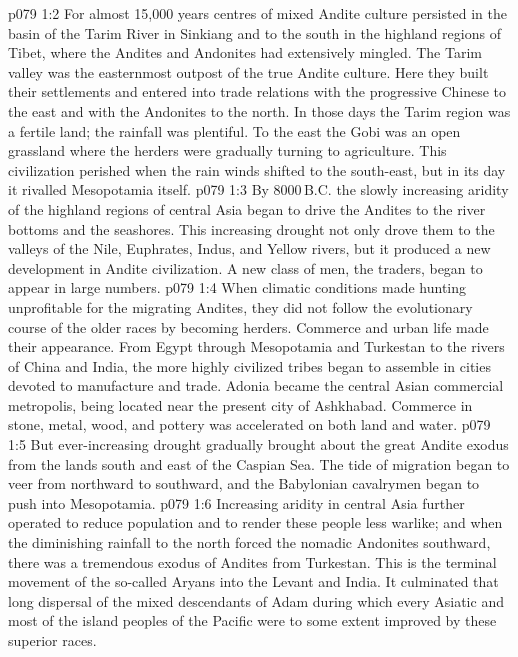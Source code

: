 \vs p079 1:2 \pc For almost 15,000 years centres of mixed Andite culture persisted in the basin of the Tarim River in Sinkiang and to the south in the highland regions of Tibet, where the Andites and Andonites had extensively mingled. The Tarim valley was the easternmost outpost of the true Andite culture. Here they built their settlements and entered into trade relations with the progressive Chinese to the east and with the Andonites to the north. In those days the Tarim region was a fertile land; the rainfall was plentiful. To the east the Gobi was an open grassland where the herders were gradually turning to agriculture. This civilization perished when the rain winds shifted to the south\hyp{}east, but in its day it rivalled Mesopotamia itself.
\vs p079 1:3 \pc By 8000\,B.C. the slowly increasing aridity of the highland regions of central Asia began to drive the Andites to the river bottoms and the seashores. This increasing drought not only drove them to the valleys of the Nile, Euphrates, Indus, and Yellow rivers, but it produced a new development in Andite civilization. A new class of men, the traders, began to appear in large numbers.
\vs p079 1:4 When climatic conditions made hunting unprofitable for the migrating Andites, they did not follow the evolutionary course of the older races by becoming herders. Commerce and urban life made their appearance. From Egypt through Mesopotamia and Turkestan to the rivers of China and India, the more highly civilized tribes began to assemble in cities devoted to manufacture and trade. Adonia became the central Asian commercial metropolis, being located near the present city of Ashkhabad. Commerce in stone, metal, wood, and pottery was accelerated on both land and water.
\vs p079 1:5 But ever\hyp{}increasing drought gradually brought about the great Andite exodus from the lands south and east of the Caspian Sea. The tide of migration began to veer from northward to southward, and the Babylonian cavalrymen began to push into Mesopotamia.
\vs p079 1:6 Increasing aridity in central Asia further operated to reduce population and to render these people less warlike; and when the diminishing rainfall to the north forced the nomadic Andonites southward, there was a tremendous exodus of Andites from Turkestan. This is the terminal movement of the so\hyp{}called Aryans into the Levant and India. It culminated that long dispersal of the mixed descendants of Adam during which every Asiatic and most of the island peoples of the Pacific were to some extent improved by these superior races.
